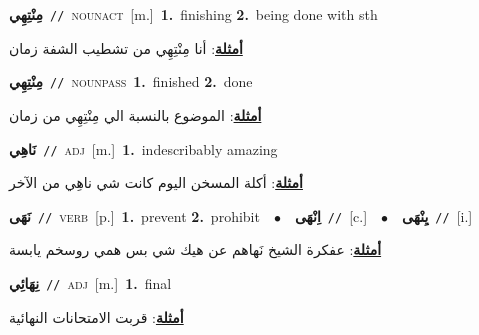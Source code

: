 \documentclass[10pt,a4paper,twoside]{article} %
\begin{document}
\begin{multicols}{2}
{\setlength\topsep{0pt}\textbf{\foreignlanguage{arabic}{مِنْتِهِي}}\ {\color{gray}\texttt{//}\color{black}}\ \textsc{noun\textunderscore act}\ [m.]\ \textbf{1.}~finishing  \textbf{2.}~being done with sth\  \begin{flushright}\color{gray}\foreignlanguage{arabic}{\textbf{\underline{\foreignlanguage{arabic}{أمثلة}}}: أنا مِنْتِهِي من تشطيب الشفة زمان}\end{flushright}\color{black}} \vspace{2mm}

{\setlength\topsep{0pt}\textbf{\foreignlanguage{arabic}{مِنْتِهِي}}\ {\color{gray}\texttt{//}\color{black}}\ \textsc{noun\textunderscore pass}\ \textbf{1.}~finished  \textbf{2.}~done\  \begin{flushright}\color{gray}\foreignlanguage{arabic}{\textbf{\underline{\foreignlanguage{arabic}{أمثلة}}}: الموضوع بالنسبة الي مِنْتِهِي من زمان}\end{flushright}\color{black}} \vspace{2mm}

{\setlength\topsep{0pt}\textbf{\foreignlanguage{arabic}{نَاهِي}}\ {\color{gray}\texttt{//}\color{black}}\ \textsc{adj}\ [m.]\ \textbf{1.}~indescribably amazing\  \begin{flushright}\color{gray}\foreignlanguage{arabic}{\textbf{\underline{\foreignlanguage{arabic}{أمثلة}}}: أكلة المسخن اليوم كانت شي ناهِي من الآخر}\end{flushright}\color{black}} \vspace{2mm}

{\setlength\topsep{0pt}\textbf{\foreignlanguage{arabic}{نَهَى}}\ {\color{gray}\texttt{//}\color{black}}\ \textsc{verb}\ [p.]\ \textbf{1.}~prevent  \textbf{2.}~prohibit\ \ $\bullet$\ \ \setlength\topsep{0pt}\textbf{\foreignlanguage{arabic}{اِنْهَى}}\ {\color{gray}\texttt{//}\color{black}}\ [c.]\ \ $\bullet$\ \ \setlength\topsep{0pt}\textbf{\foreignlanguage{arabic}{يِنْهَى}}\ {\color{gray}\texttt{//}\color{black}}\ [i.]\  \begin{flushright}\color{gray}\foreignlanguage{arabic}{\textbf{\underline{\foreignlanguage{arabic}{أمثلة}}}: عفكرة الشيخ نَهاهم عن هيك شي بس همي روسخم يابسة}\end{flushright}\color{black}} \vspace{2mm}

{\setlength\topsep{0pt}\textbf{\foreignlanguage{arabic}{نِهَائِي}}\ {\color{gray}\texttt{//}\color{black}}\ \textsc{adj}\ [m.]\ \textbf{1.}~final\  \begin{flushright}\color{gray}\foreignlanguage{arabic}{\textbf{\underline{\foreignlanguage{arabic}{أمثلة}}}: قربت الامتحانات النهائية}\end{flushright}\color{black}} \vspace{2mm}


\end{multicols}
\end{document}
